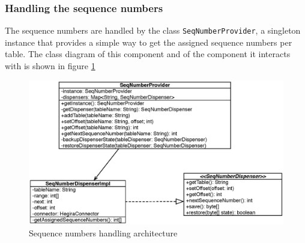 \subsubsection{Handling the sequence numbers}
The sequence numbers are handled by the class \texttt{SeqNumberProvider}, a singleton instance that provides a simple way to get the assigned sequence numbers per table.
\noindent The class diagram of this component and of the component it interacts with is shown in figure \ref{fig:seq-provider}

\begin{figure}[tbh]
  \centering
  \includegraphics[width=12cm]{images/seq_provider}
  \caption{Sequence numbers handling architecture}
  \label{fig:seq-provider}
\end{figure} 

